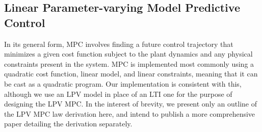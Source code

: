 \documentclass[letterpaper, 10 pt, conference]{ieeeconf}  %
\begin{document}
\subsection{Linear Parameter-varying Model Predictive Control}\label{subsec:LPVMPC}

In its general form, MPC involves finding a future control trajectory that minimizes a given cost function subject to the plant dynamics and any physical constraints present in the system. MPC is implemented most commonly using a quadratic cost function, linear model, and linear constraints, meaning that it can be cast as a quadratic program. Our implementation is consistent with this, although we use an LPV model in place of an LTI one for the purpose of designing the LPV MPC. In the interest of brevity, we present only an outline of the LPV MPC law derivation here, and intend to publish a more comprehensive paper detailing the derivation separately. 
\end{document}
